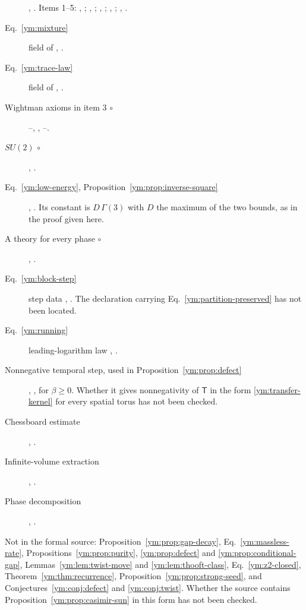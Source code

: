 \begin{description}
 , . Items 1--5:
 , ;
 , ;
 , ;
 , ;
 , .
\item[Eq.~\eqref{ym:mixture}] field  of
 , .
\item[Eq.~\eqref{ym:trace-law}] field  of
 , .
\item[Wightman axioms in item 3 $\circ$]
 --, ,
 --.
\item[$SU(2)$ $\circ$] ,
 .
\item[Eq.~\eqref{ym:low-energy}, Proposition~\ref{ym:prop:inverse-square}]
 , .
 Its constant is $D\,\Gamma(3)$ with $D$ the maximum of the two bounds, as in
 the proof given here.
\item[A theory for every phase $\circ$]
 ,
 .
\item[Eq.~\eqref{ym:block-step}] step data ,
 . The declaration carrying
 Eq.~\eqref{ym:partition-preserved} has not been located.
\item[Eq.~\eqref{ym:running}] leading-logarithm law
 ,
 .
\item[Nonnegative temporal step, used in Proposition~\ref{ym:prop:defect}]
 , , for
 $\beta\ge0$. Whether it gives nonnegativity of $\mathsf T$ in the form
 \eqref{ym:transfer-kernel} for every spatial torus has not been checked.
\item[Chessboard estimate] ,
 .
\item[Infinite-volume extraction] ,
 .
\item[Phase decomposition] ,
 .
\end{description}
Not in the formal source: Proposition~\ref{ym:prop:gap-decay},
Eq.~\eqref{ym:massless-rate}, Propositions~\ref{ym:prop:purity},
\ref{ym:prop:defect} and \ref{ym:prop:conditional-gap},
Lemmas~\ref{ym:lem:twist-move} and \ref{ym:lem:thooft-class},
Eq.~\eqref{ym:z2-closed}, Theorem~\ref{ym:thm:recurrence},
Proposition~\ref{ym:prop:strong-seed}, and
Conjectures~\ref{ym:conj:defect} and \ref{ym:conj:twist}. Whether the
source contains Proposition~\ref{ym:prop:casimir-sun} in this form has not
been checked.
